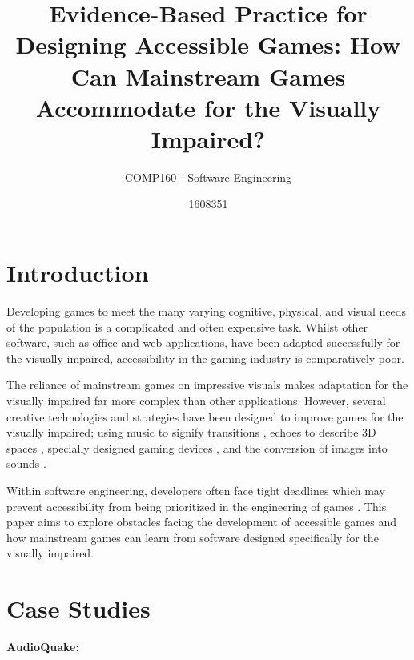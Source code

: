 \documentclass{scrartcl}
\title{Evidence-Based Practice for Designing Accessible Games: How Can Mainstream Games Accommodate for the Visually Impaired?}
\subtitle{COMP160 - Software Engineering}
\author{1608351}
\begin{document}
\maketitle


\section{Introduction}

{Developing games to meet the many varying cognitive, physical, and visual needs of the population is a complicated and often expensive task. Whilst other software, such as office and web applications,  have been adapted successfully for the visually impaired, accessibility in the gaming industry is comparatively poor.

The reliance of mainstream games on impressive visuals makes adaptation for the visually impaired far more complex than other applications. However, several creative technologies and strategies have been designed to improve games for the visually impaired;  using music to signify transitions \cite{1}, echoes to describe 3D spaces \cite{5}, specially designed gaming devices \cite{2} \cite{8}, and the conversion of images into sounds \cite{9}.

Within software engineering, developers often face tight deadlines which may prevent accessibility from being prioritized in the engineering of games \cite{3} \cite{10} . This paper aims to explore obstacles facing the development of accessible games and how mainstream games can learn from software designed specifically for the visually impaired.}


\section{Case Studies}

\textbf{AudioQuake:}
 
\end{document}
